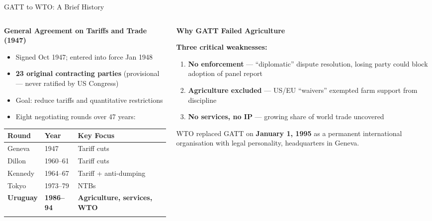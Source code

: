 \documentclass[
  ignorenonframetext,
  aspectratio=169,
]{beamer}
\makeatletter
\providecommand{\tightlist}{%
  \setlength{\itemsep}{0pt}\setlength{\parskip}{0pt}}
\let\quarto@originallabel\label
\DeclareRobustCommand*{\label}[1]{\quarto@originallabel{#1}}
\makeatother
\begin{document}
\begin{frame}{GATT to WTO: A Brief History}
\label{gatt-to-wto-a-brief-history}
\begin{columns}[T]
\begin{column}{0.5\linewidth}
\textbf{General Agreement on Tariffs and Trade (1947)}

\begin{itemize}
\tightlist
\item
  Signed Oct 1947; entered into force Jan 1948
\item
  \textbf{23 original contracting parties} (provisional --- never
  ratified by US Congress)
\item
  Goal: reduce tariffs and quantitative restrictions
\item
  Eight negotiating rounds over 47 years:
\end{itemize}

\begin{longtable}[]{@{}lll@{}}
\toprule\noalign{}
Round & Year & Key Focus \\
\midrule\noalign{}
\endhead
Geneva & 1947 & Tariff cuts \\
Dillon & 1960--61 & Tariff cuts \\
Kennedy & 1964--67 & Tariff + anti-dumping \\
Tokyo & 1973--79 & NTBs \\
\textbf{Uruguay} & \textbf{1986--94} & \textbf{Agriculture, services,
WTO} \\
\bottomrule\noalign{}
\end{longtable}
\end{column}

\begin{column}{0.5\linewidth}
\textbf{Why GATT Failed Agriculture}

\textbf{Three critical weaknesses:}

\begin{enumerate}
\tightlist
\item
  \textbf{No enforcement} --- ``diplomatic'' dispute resolution, losing
  party could block adoption of panel report
\item
  \textbf{Agriculture excluded} --- US/EU ``waivers'' exempted farm
  support from discipline
\item
  \textbf{No services, no IP} --- growing share of world trade uncovered
\end{enumerate}

WTO replaced GATT on \textbf{January 1, 1995} as a permanent
international organisation with legal personality, headquarters in
Geneva.
\end{column}
\end{columns}
\end{frame}
\end{document}
